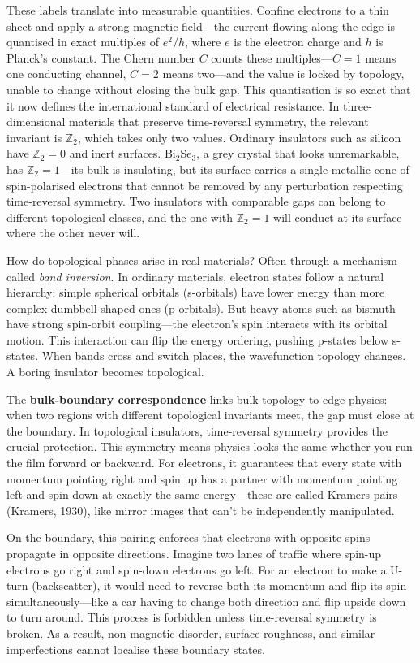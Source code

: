 These labels translate into measurable quantities. Confine electrons to a thin sheet and apply a strong magnetic field—the current flowing along the edge is quantised in exact multiples of $e^2/h$, where $e$ is the electron charge and $h$ is Planck's constant. The Chern number $C$ counts these multiples—$C = 1$ means one conducting channel, $C = 2$ means two—and the value is locked by topology, unable to change without closing the bulk gap. This quantisation is so exact that it now defines the international standard of electrical resistance. In three-dimensional materials that preserve time-reversal symmetry, the relevant invariant is $\mathbb{Z}_2$, which takes only two values. Ordinary insulators such as silicon have $\mathbb{Z}_2 = 0$ and inert surfaces. Bi$_2$Se$_3$, a grey crystal that looks unremarkable, has $\mathbb{Z}_2 = 1$—its bulk is insulating, but its surface carries a single metallic cone of spin-polarised electrons that cannot be removed by any perturbation respecting time-reversal symmetry. Two insulators with comparable gaps can belong to different topological classes, and the one with $\mathbb{Z}_2 = 1$ will conduct at its surface where the other never will.

How do topological phases arise in real materials? Often through a mechanism called \emph{band inversion}. In ordinary materials, electron states follow a natural hierarchy: simple spherical orbitals (s-orbitals) have lower energy than more complex dumbbell-shaped ones (p-orbitals). But heavy atoms such as bismuth have strong spin-orbit coupling—the electron's spin interacts with its orbital motion. This interaction can flip the energy ordering, pushing p-states below s-states. When bands cross and switch places, the wavefunction topology changes. A boring insulator becomes topological.

The \textbf{bulk-boundary correspondence} links bulk topology to edge physics: when two regions with different topological invariants meet, the gap must close at the boundary. 
In topological insulators, time-reversal symmetry provides the crucial protection. This symmetry means physics looks the same whether you run the film forward or backward. For electrons, it guarantees that every state with momentum pointing right and spin up has a partner with momentum pointing left and spin down at exactly the same energy—these are called Kramers pairs (Kramers, 1930), like mirror images that can't be independently manipulated.

On the boundary, this pairing enforces that electrons with opposite spins propagate in opposite directions. Imagine two lanes of traffic where spin-up electrons go right and spin-down electrons go left. For an electron to make a U-turn (backscatter), it would need to reverse both its momentum and flip its spin simultaneously—like a car having to change both direction and flip upside down to turn around. This process is forbidden unless time-reversal symmetry is broken. As a result, non-magnetic disorder, surface roughness, and similar imperfections cannot localise these boundary states. 

